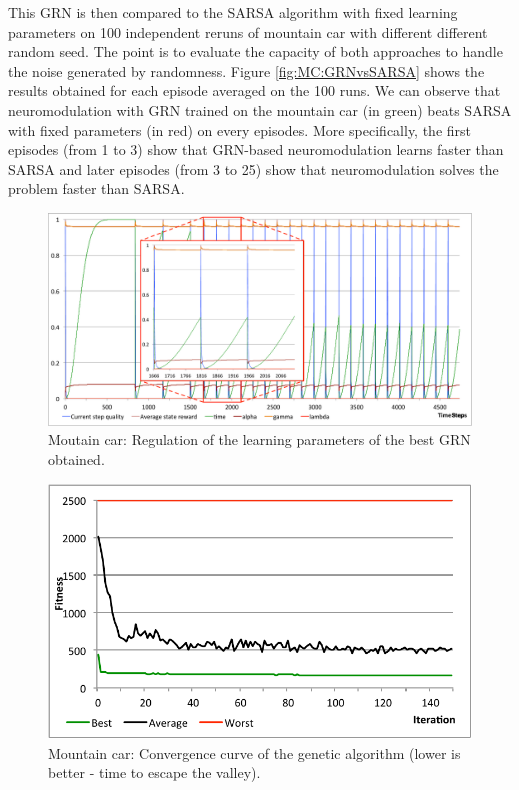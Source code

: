This GRN is then compared to the SARSA algorithm with fixed learning parameters on 100 independent reruns of mountain car with different different random seed. The point is to evaluate the capacity of both approaches to handle the noise generated by randomness. Figure \ref{fig:MC:GRNvsSARSA} shows the results obtained for each episode averaged on the 100 runs. We can observe that neuromodulation with GRN trained on the mountain car (in green) beats SARSA with fixed parameters (in red) on every episodes. More specifically, the first episodes (from 1 to 3) show that GRN-based neuromodulation learns faster than SARSA and later episodes (from 3 to 25) show that neuromodulation solves the problem faster than SARSA.

\begin{figure}
\center
\includegraphics[width=\linewidth]{MC_GRNBehavior.pdf}
\caption{Moutain car: Regulation of the learning parameters of the best GRN obtained.}\label{fig:MC:GRNBehavior}
\end{figure}

\begin{figure}
\center
\includegraphics[width=0.75\linewidth]{MC_convergence.pdf}
\caption{Mountain car: Convergence curve of the genetic algorithm (lower is better - time to escape the valley).}\label{fig:MC:Convergence}
\end{figure}

